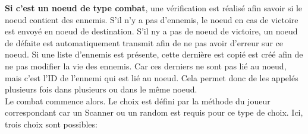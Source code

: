		\textbf{Si c'est un noeud de type combat}, une vérification est réalisé afin savoir si le noeud contient des ennemis. S'il n'y a pas d'ennemis, le noeud en cas de victoire est envoyé en noeud de destination. S'il ny a pas de noeud de victoire, un noeud de défaite est automatiquement transmit afin de ne pas avoir d'erreur sur ce noeud. Si une liste d'ennemis est présente, cette dernière est copié est créé afin de ne pas modifier la vie des ennemis. Car ces derniers ne sont pas lié au noeud, mais c'est l'ID de l'ennemi qui est lié au noeud. Cela permet donc de les appelés plusieurs fois dans plusieurs ou dans le même noeud.\\
		Le combat commence alors. Le choix est défini par la méthode du joueur correspondant car un Scanner ou un random est requis pour ce type de choix. Ici, trois choix sont possibles:

